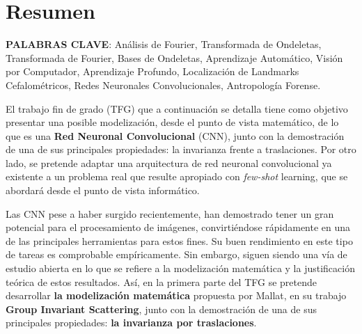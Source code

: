 %


\chapter{Resumen}

\textbf{PALABRAS CLAVE}: Análisis de Fourier, Transformada de Ondeletas, Transformada de Fourier, Bases de Ondeletas, Aprendizaje Automático, Visión por Computador, Aprendizaje Profundo, Localización de Landmarks Cefalométricos, Redes Neuronales Convolucionales, Antropología Forense.

\vspace{10mm}
\noindent El trabajo fin de grado (TFG) que a continuación se detalla tiene como objetivo presentar una posible modelización, desde el punto de vista matemático, de lo que es una \textbf{Red Neuronal Convolucional} (CNN), junto con la demostración de una de sus principales propiedades: la invarianza frente a traslaciones. Por otro lado, se pretende adaptar una arquitectura de red neuronal convolucional ya existente a un problema real que resulte apropiado con \textit{few-shot} learning, que se abordará desde el punto de vista informático.

\medskip

\noindent Las CNN pese a haber surgido recientemente, han demostrado tener un gran potencial para el procesamiento de imágenes, convirtiéndose rápidamente en una de las principales herramientas para estos fines. Su buen rendimiento en este tipo de tareas es comprobable empíricamente. Sin embargo, siguen siendo una vía de estudio abierta en lo que se refiere a la modelización matemática y la justificación teórica de estos resultados. Así, en la primera parte del TFG se pretende desarrollar \textbf{la modelización matemática} propuesta por Mallat, en su trabajo \textbf{Group Invariant Scattering}, junto con la demostración de una de sus principales propiedades: \textbf{la invarianza por traslaciones}.

\medskip

